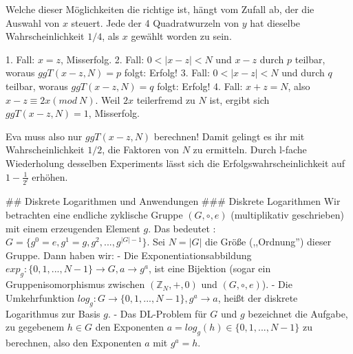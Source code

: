 \documentclass[a4paper]{article}
\begin{document}
\begin{multicols}{3}
{{{{        Welche dieser Möglichkeiten die richtige ist, hängt vom Zufall ab, der die Auswahl von $x$ steuert. Jede der 4 Quadratwurzeln von $y$ hat dieselbe Wahrscheinlichkeit $1/4$, als $x$ gewählt worden zu sein.

        1. Fall: $x=z$, Misserfolg.
        2. Fall: $0<|x-z|< N$ und $x-z$ durch $p$ teilbar, woraus $ggT(x-z,N) =p$ folgt: Erfolg!
        3. Fall: $0<|x-z|< N$ und durch $q$ teilbar, woraus $ggT(x-z,N) =q$ folgt: Erfolg!
        4. Fall: $x+z=N$, also $x-z\equiv 2x(mod\ N)$. Weil $2x$ teilerfremd zu $N$ ist, ergibt sich $ggT(x-z,N)=1$, Misserfolg.

        Eva muss also nur $ggT(x-z,N)$ berechnen! Damit gelingt es ihr mit Wahrscheinlichkeit $1/2$, die Faktoren von $N$ zu ermitteln. Durch l-fache Wiederholung desselben Experiments lässt sich die Erfolgswahrscheinlichkeit auf $1-\frac{1}{2^l}$ erhöhen.

        ## Diskrete Logarithmen und Anwendungen
        ### Diskrete Logarithmen
        Wir betrachten eine endliche zyklische Gruppe $(G,\circ,e)$ (multiplikativ geschrieben) mit einem erzeugenden Element $g$. Das bedeutet : $G=\{g^0=e,g^1=g,g^2,...,g^{|G|- 1}\}$. Sei $N=|G|$ die Größe (,,Ordnung'') dieser Gruppe. Dann haben wir:
        - Die Exponentiationsabbildung $exp_g:\{0,1,...,N-1\}\rightarrow G, a\rightarrow g^a$, ist eine Bijektion (sogar ein Gruppenisomorphismus zwischen $(\mathbb{Z}_N,+,0)$ und $(G,\circ,e)$).
        - Die Umkehrfunktion $log_g:G\rightarrow\{0,1,...,N-1\},g^a\rightarrow a$, heißt der diskrete Logarithmus zur Basis $g$.
        - Das DL-Problem für $G$ und $g$ bezeichnet die Aufgabe, zu gegebenem $h\in G$ den Exponenten $a=log_g (h) \in\{0,1,...,N-1\}$ zu berechnen, also den Exponenten $a$ mit $g^a=h$.

}}}}
\end{multicols}
\end{document}
